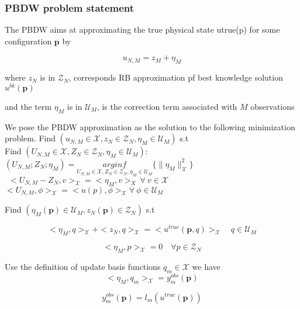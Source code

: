 \documentclass[a4paper,10pt]{beamer}
\numberwithin{equation}{section}
\begin{document}
\begin{frame}
\frametitle{PBDW problem statement}


The PBDW aims at approximating the true physical state utrue(p) for some configuration $\textbf{p}$ by

\begin{equation}
u_{N,M} = z_M + \eta_M
\end{equation}

where $z_N$ is in $\mathcal{Z}_N$, corresponds RB approximation pf best knowledge solution $u^{bk}(\textbf{p})$

and the term $\eta_M$ is in $\mathcal{U}_M$, is the correction term associated with $M$ observations

We pose the PBDW approximation as the solution to the following minimization problem. Find $(u_{N,M} \in \mathcal{X}, z_N \in \mathcal{Z}_N,\eta_M \in \mathcal{U}_M)$ s.t
\\ 
Find $(U_{N,M}\in \mathcal{X},Z_{N}\in \mathcal{Z}_{N},\eta_{M}\in \mathcal{U}_{M}):$
$(U_{N,M};Z_{N};\eta_{M})=\underset{U_{N,M}\in \mathcal{X},Z_{N}\in \mathcal{Z}_{N},\eta_{M}\in \mathcal{U}_{M}}{arginf}\{ \| \eta_{M}\|_{\mathcal{X}}^{2}\}$
$ \ \ <U_{N,M}-Z_{N},v>_{\mathcal{X}}=<\eta_{M},v>_{X}\ \forall\ v\in \mathcal{X}$ \\ $ <U_{N,M},\phi>_{\mathcal{X}}=<u(p),\phi>_{\mathcal{X}} \forall\ \phi \in \mathcal{U}_{M} $


\end{frame}



\begin{frame}
Find $(\eta_M(\textbf{p}) \in \mathcal{U}_M, z_N(\textbf{p})\in \mathcal{Z}_N)$ s.t

\begin{equation}
<\eta_M,q>_{\mathcal{X}} + <z_N,q>_{\mathcal{X}} = <u^{true}(\textbf{p},q)>_{\mathcal{X}} \quad q \in \mathcal{U}_M
\end{equation}

\begin{equation}
<\eta_M,p>_{\mathcal{X}} = 0 \quad \forall p \in \mathcal{Z}_N
\end{equation}

Use the definition of update basis functions $q_m \in \mathcal{X}$ we have
\begin{equation}
<\eta_M,q_m>_{\mathcal{X}} = y^{obs}_m(\textbf{p})
\end{equation}

\begin{equation}
y^{obs}_m(\textbf{p}) = l_m(u^{true}(\textbf{p}))
\end{equation}
\end{frame}
\end{document}
